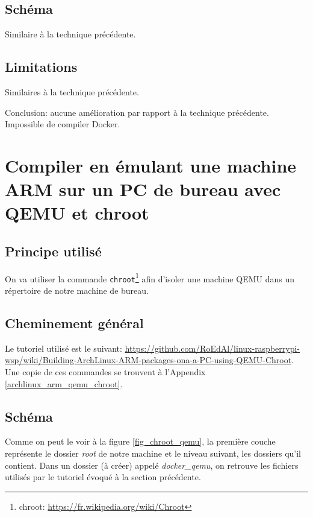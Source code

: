 \documentclass[11pt,a4paper,oneside]{report}
\newcommand{\code}[1]{\texttt{#1}} %
\begin{document}
\subsection{Schéma}

Similaire à la technique précédente.

\subsection{Limitations}

Similaires à la technique précédente.

Conclusion: aucune amélioration par rapport à la technique précédente. Impossible de compiler Docker.



\section{Compiler en émulant une machine ARM sur un PC de bureau avec QEMU et chroot}

\subsection{Principe utilisé}

On va utiliser la commande \code{chroot}\footnote{chroot: \url{https://fr.wikipedia.org/wiki/Chroot}} afin d'isoler une machine QEMU dans un répertoire de notre machine de bureau.

\subsection{Cheminement général}

Le tutoriel utilisé est le suivant: \url{https://github.com/RoEdAl/linux-raspberrypi-wsp/wiki/Building-ArchLinux-ARM-packages-ona-a-PC-using-QEMU-Chroot}. Une copie de ces commandes se trouvent à l'Appendix \ref{archlinux_arm_qemu_chroot}.

\subsection{Schéma}

Comme on peut le voir à la figure \ref{fig_chroot_qemu}, la première couche représente le dossier \textit{root} de notre machine et le niveau suivant, les dossiers qu'il contient. Dans un dossier (à créer) appelé \textit{docker\_qemu}, on retrouve les fichiers utilisés par le tutoriel évoqué à la section précédente.
\end{document}
